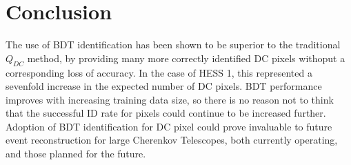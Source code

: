 \documentclass[]{article}
\begin{document}
\section{Conclusion}
The use of BDT identification has been shown to be superior to the traditional $Q_{DC}$ method, by providing many more correctly identified DC pixels withoput a corresponding loss of accuracy. In the case of HESS 1, this represented a sevenfold increase in the expected number of DC pixels. BDT performance improves with increasing training data size, so there is no reason not to think that the successful ID rate for pixels could continue to be increased further. Adoption of BDT identification for DC pixel could prove invaluable to future event reconstruction for large Cherenkov Telescopes, both currently operating, and those planned for the future. 



\end{document}
